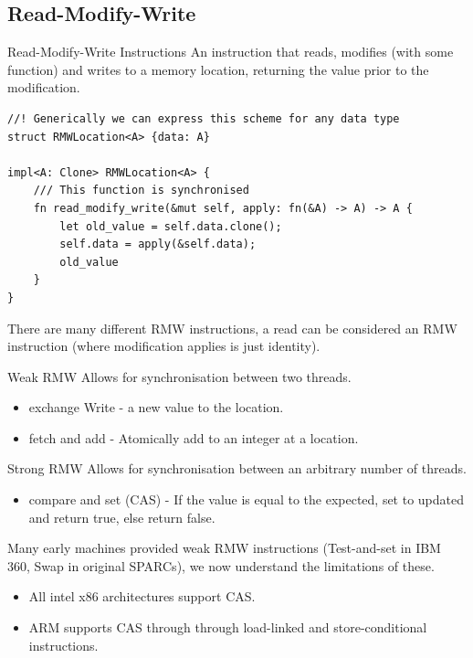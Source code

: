 \subsection{Read-Modify-Write}
\begin{definitionbox}{Read-Modify-Write Instructions}
    An instruction that reads, modifies (with some function) and writes to a memory location, returning the value prior to the modification.
    \begin{verbatim}
//! Generically we can express this scheme for any data type
struct RMWLocation<A> {data: A}

impl<A: Clone> RMWLocation<A> {
    /// This function is synchronised
    fn read_modify_write(&mut self, apply: fn(&A) -> A) -> A {
        let old_value = self.data.clone();
        self.data = apply(&self.data);
        old_value
    }
}
    \end{verbatim}
\end{definitionbox}
There are many different RMW instructions, a read can be considered an RMW instruction (where modification applies is just identity).
\begin{tcbraster}[raster columns=2, raster equal height]
    \begin{definitionbox}{Weak RMW}
        Allows for synchronisation between two threads.
        \begin{itemize}
            \item exchange Write - a new value to the location.
            \item fetch and add - Atomically add to an integer at a location. \\
        \end{itemize}
    \end{definitionbox}
    \begin{definitionbox}{Strong RMW}
        Allows for synchronisation between an arbitrary number of threads.
        \begin{itemize}
            \item compare and set (CAS) - If the value is equal to the expected, set to updated and return true, else return false.
        \end{itemize}
    \end{definitionbox}
\end{tcbraster}
Many early machines provided weak RMW instructions (Test-and-set in IBM 360, Swap in original SPARCs), we now understand the limitations of these.
\begin{itemize}
    \item All intel x86 architectures support CAS.
    \item ARM supports CAS through through load-linked and store-conditional instructions.
\end{itemize}

